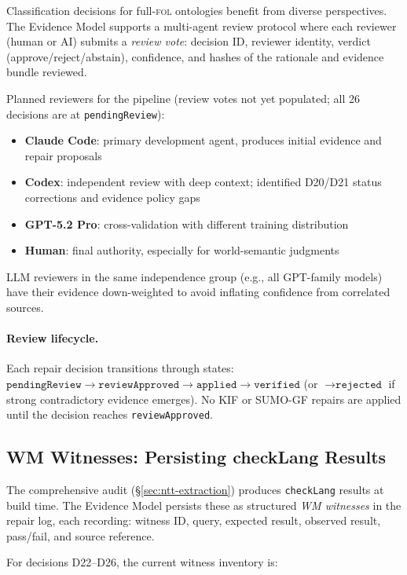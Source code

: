 \documentclass[11pt]{article}
\newcommand{\FOL}{\textsc{fol}}
\theoremstyle{definition}
\theoremstyle{plain}
\begin{document}
Classification decisions for full-\FOL{} ontologies benefit from
diverse perspectives.  The Evidence Model supports a multi-agent
review protocol where each reviewer (human or AI) submits a
\emph{review vote}: decision ID, reviewer identity, verdict
(approve/reject/abstain), confidence, and hashes of the rationale
and evidence bundle reviewed.

Planned reviewers for the pipeline (review votes not yet
populated; all 26 decisions are at \texttt{pendingReview}):
\begin{itemize}[nosep]
  \item \textbf{Claude Code}: primary development agent, produces
    initial evidence and repair proposals
  \item \textbf{Codex}: independent review with deep context;
    identified D20/D21 status corrections and evidence policy gaps
  \item \textbf{GPT-5.2 Pro}: cross-validation with different
    training distribution
  \item \textbf{Human}: final authority, especially for
    world-semantic judgments
\end{itemize}

LLM reviewers in the same independence group (e.g., all GPT-family
models) have their evidence down-weighted to avoid inflating
confidence from correlated sources.

\paragraph{Review lifecycle.}
Each repair decision transitions through states:
$\texttt{pendingReview} \to \texttt{reviewApproved} \to
\texttt{applied} \to \texttt{verified}$ (or $\to \texttt{rejected}$
if strong contradictory evidence emerges).  No KIF or SUMO-GF
repairs are applied until the decision reaches
\texttt{reviewApproved}.

\subsection{WM Witnesses: Persisting checkLang Results}

The comprehensive audit (\S\ref{sec:ntt-extraction}) produces
\texttt{checkLang} results at build time.  The Evidence Model
persists these as structured \emph{WM witnesses} in the repair
log, each recording: witness ID, query, expected result,
observed result, pass/fail, and source reference.

For decisions D22--D26, the current witness inventory is:
\end{document}
